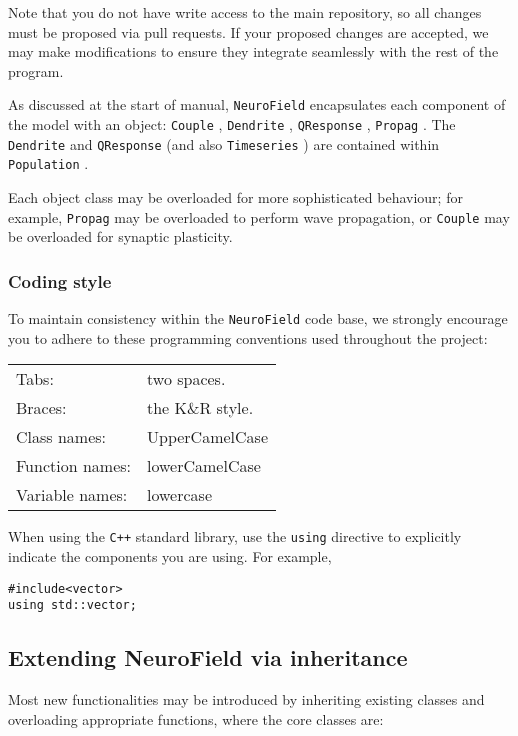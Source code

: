 \documentclass[12pt,a4paper]{article}
\newcommand{\type}[1]{{\small\small\tt #1} }
\newcommand{\NF}[0]{\type{NeuroField}}
\begin{document}
Note that you do not have write access to the main repository, so all changes must be proposed via pull requests. If your proposed changes are accepted, we may make modifications to ensure they integrate seamlessly with the rest of the program.

As discussed at the start of manual, \NF encapsulates each component of the model with an object: \type{Couple}, \type{Dendrite}, \type{QResponse}, \type{Propag}. The \type{Dendrite} and \type{QResponse} (and also \type{Timeseries}) are contained within \type{Population}.

Each object class may be overloaded for more sophisticated behaviour; for example, \type{Propag} may be overloaded to perform wave propagation, or \type{Couple} may be overloaded for synaptic plasticity.

\subsubsection{Coding style}

To maintain consistency within the \NF code base, we strongly encourage you to adhere to these programming conventions used throughout the project: 

\begin{tabular}{ l l }
	Tabs:& two spaces.\\
	Braces:& the K\&R style.\\
	Class names:&UpperCamelCase\\
	Function names:&lowerCamelCase\\
	Variable names:&lowercase
\end{tabular}

When using the \type{C++} standard library, use the \type{using} directive to explicitly indicate the components you are using. For example,

\begin{lstlisting}
#include<vector>
using std::vector;
\end{lstlisting}

\subsection{Extending NeuroField via inheritance}
\label{sec:extension}

Most new functionalities may be introduced by inheriting existing classes and overloading appropriate functions, where the core classes are:
\end{document}

